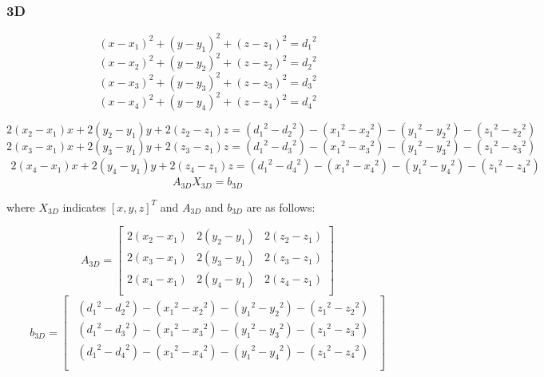 \documentclass{ieeeaccess}
\begin{document}
\subsubsection{3D}

\begin{equation}
(x-x_1)^2+(y-y_1)^2+(z-z_1)^2={d_1}^2
\end{equation}
\begin{equation}
(x-x_2)^2+(y-y_2)^2+(z-z_2)^2={d_2}^2
\end{equation}
\begin{equation}
(x-x_3)^2+(y-y_3)^2+(z-z_3)^2={d_3}^2
\end{equation}
\begin{equation}
(x-x_4)^2+(y-y_4)^2+(z-z_4)^2={d_4}^2
\end{equation}


\begin{equation}
2(x_2-x_1)x+2(y_2-y_1)y+2(z_2-z_1)z =  
({d_1}^2-{d_2}^2)-({x_1}^2-{x_2}^2)-({y_1}^2-{y_2}^2)-({z_1}^2-{z_2}^2)
\end{equation}
\begin{equation}
2(x_3-x_1)x+2(y_3-y_1)y+2(z_3-z_1)z=
({d_1}^2-{d_3}^2)-({x_1}^2-{x_3}^2)-({y_1}^2-{y_3}^2)-({z_1}^2-{z_3}^2)
\end{equation}
\begin{equation}
\substack{
	2(x_4-x_1)x+2(y_4-y_1)y+2(z_4-z_1)z=
	({d_1}^2-{d_4}^2)-({x_1}^2-{x_4}^2)-({y_1}^2-{y_4}^2)-({z_1}^2-{z_4}^2)
}
\end{equation}
\begin{equation}
A_{3D}X_{3D}=b_{3D}
\end{equation}

where $X_{3D}$ indicates $[x,y,z]^T$ and $A_{3D}$ and $b_{3D}$ are as follows: 

\begin{equation}
A_{3D} =\left[ {\begin{array}{ccc}
	2(x_2-x_1) & 2(y_2-y_1) & 2(z_2-z_1)\\
	2(x_3-x_1) & 2(y_3-y_1) & 2(z_3-z_1)\\
	2(x_4-x_1) & 2(y_4-y_1) & 2(z_4-z_1)\\
	\end{array} } \right]
\end{equation}
\begin{equation}
b_{3D} = \left[ {\begin{array}{c}
	\substack{
		({d_1}^2-{d_2}^2)-({x_1}^2-{x_2}^2)-({y_1}^2-{y_2}^2)-({z_1}^2-{z_2}^2)\\
		({d_1}^2-{d_3}^2)-({x_1}^2-{x_3}^2)-({y_1}^2-{y_3}^2)-({z_1}^2-{z_3}^2)\\
		({d_1}^2-{d_4}^2)-({x_1}^2-{x_4}^2)-({y_1}^2-{y_4}^2)-({z_1}^2-{z_4}^2)\\
	}
	\end{array} } \right]
\end{equation}
\end{document}
